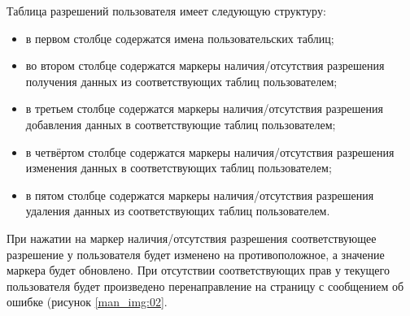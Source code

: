Таблица разрешений пользователя имеет следующую структуру:
\begin{itemize}
    \item в первом столбце содержатся имена пользовательских таблиц;
    \item во втором столбце содержатся маркеры наличия/отсутствия разрешения получения данных из соответствующих таблиц пользователем;
    \item в третьем столбце содержатся маркеры наличия/отсутствия разрешения добавления данных в соответствующие таблиц пользователем;
    \item в четвёртом столбце содержатся маркеры наличия/отсутствия разрешения изменения данных в соответствующих таблиц пользователем;
    \item в пятом столбце содержатся маркеры наличия/отсутствия разрешения удаления данных из соответствующих таблиц пользователем.
\end{itemize}

При нажатии на маркер наличия/отсутствия разрешения соответствующее разрешение у пользователя будет изменено на противоположное, а значение маркера будет обновлено. При отсутствии соответствующих прав у текущего пользователя будет произведено перенаправление на страницу с сообщением об ошибке (рисунок \ref{man_img:02}.\par
